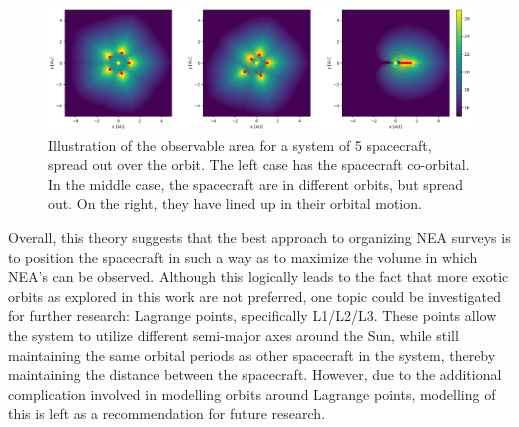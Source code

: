 \begin{figure}[htbp]
 \centering
 \includegraphics[width=1.0\textwidth]{img/coverage_free.png}
 \caption{Illustration of the observable area for a system of 5 spacecraft, spread out over the orbit. The left case has the spacecraft co-orbital. In the middle case, the spacecraft are in different orbits, but spread out. On the right, they have lined up in their orbital motion.}
 \label{fig:coverage_free}
\end{figure}

Overall, this theory suggests that the best approach to organizing NEA surveys is to position the spacecraft in such a way as to maximize the volume in which NEA's can be observed. Although this logically leads to the fact that more exotic orbits as explored in this work are not preferred, one topic could be investigated for further research: Lagrange points, specifically L1/L2/L3. These points allow the system to utilize different semi-major axes around the Sun, while still maintaining the same orbital periods as other spacecraft in the system, thereby maintaining the distance between the spacecraft. However, due to the additional complication involved in modelling orbits around Lagrange points, modelling of this is left as a recommendation for future research.


